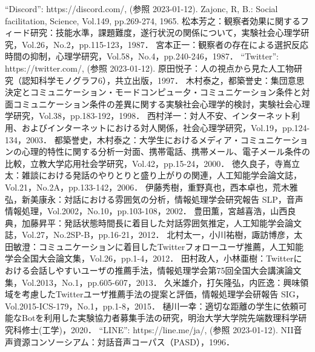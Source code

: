 
\begin{thebibliography}{99}
``Discord'': https://discord.com/, (参照 2023-01-12).
Zajonc, R, B.: Social facilitation, Science, Vol.149, pp.269-274, 1965.
松本芳之：観察者効果に関するフィード研究：技能水準，課題難度，遂行状況の関係について，実験社会心理学研究，Vol.26，No.2，pp.115-123，1987．
宮本正一：観察者の存在による選択反応時間の抑制，心理学研究，Vol.58，No.4，pp.240-246，1987．
``Twitter'': https://twitter.com/, (参照 2023-01-12).
原田悦子：人の視点から見た人工物研究（認知科学モノグラフ6），共立出版，1997．
木村泰之，都築誉史：集団意思決定とコミュニケーション・モードコンピュー夕・コミュニケーション条件と対面コミュニケーション条件の差異に関する実験社会心理学的検討，実験社会心理学研究，Vol.38，pp.183-192，1998．
西村洋一：対人不安、インターネット利用、およびインターネットにおける対人関係，社会心理学研究，Vol.19，pp.124-134，2003．
都築誉史，木村泰之：大学生におけるメディア・コミュニケーションの心理的特性に関する分析一対面、携帯電話、携帯メール、電子メール条件の比較，立教大学応用社会学研究，Vol.42，pp.15-24，2000．
徳久良子，寺嶌立太：雑談における発話のやりとりと盛り上がりの関連，人工知能学会論文誌，Vol.21，No.2A，pp.133-142，2006．
伊藤秀樹，重野真也，西本卓也，荒木雅弘，新美康永：対話における雰囲気の分析，情報処理学会研究報告 SLP，音声情報処理，Vol.2002，No.10，pp.103-108，2002．
豊田薫，宮越喜浩，山西良典，加藤昇平：発話状態時間長に着目した対話雰囲気推定，人工知能学会論文誌，Vol.27，No.2SP-B，pp.16-21，2012．
北村太一，小川祐樹，諏訪博彦，太田敏澄：コミュニケーションに着目したTwitterフォローユーザ推薦，人工知能学会全国大会論文集，Vol.26，pp.1-4，2012．
田村政人，小林亜樹：Twitterにおける会話しやすいユーザの推薦手法，情報処理学会第75回全国大会講演論文集，Vol.2013，No.1，pp.605-607，2013．
久米雄介，打矢隆弘，内匠逸：興味領域を考慮したTwitterユーザ推薦手法の提案と評価，情報処理学会研報告 SIG，Vol.2015-ICS-179，No.1，pp.1-8，2015．
樋川一幸：適切な距離の学生に依頼可能なBotを利用した実験協力者募集手法の研究，明治大学大学院先端数理科学研究科修士(工学)，2020． 
``LINE'': https://line.me/ja/, (参照 2023-01-12).
NII音声資源コンソーシアム：対話音声コーパス（PASD），1996．
\end{thebibliography}
